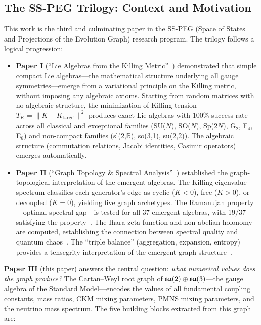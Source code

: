 \subsection{The SS-PEG Trilogy: Context and Motivation}\label{sec:trilogy}

This work is the third and culminating paper in the SS-PEG (Space of States and Projections of the Evolution Graph) research program. The trilogy follows a logical progression:

\begin{itemize}
\item \textbf{Paper I} (``Lie Algebras from the Killing Metric''~\cite{paper1_killing_algebra}) demonstrated that simple compact Lie algebras---the mathematical structure underlying all gauge symmetries---emerge from a variational principle on the Killing metric, without imposing any algebraic axioms. Starting from random matrices with no algebraic structure, the minimization of Killing tension $T_K = \|K - K_{\mathrm{target}}\|^2$ produces exact Lie algebras with 100\% success rate across all classical and exceptional families (SU($N$), SO($N$), Sp($2N$), G$_2$, F$_4$, E$_6$) and non-compact families (sl(2,$\mathbb{R}$), so(3,1), su(2,2)). The algebraic structure (commutation relations, Jacobi identities, Casimir operators) emerges automatically.

\item \textbf{Paper II} (``Graph Topology \& Spectral Analysis''~\cite{paper2_graph_topology}) established the graph-topological interpretation of the emergent algebras. The Killing eigenvalue spectrum classifies each generator's edge as cyclic ($K < 0$), free ($K > 0$), or decoupled ($K = 0$), yielding five graph archetypes. The Ramanujan property---optimal spectral gap---is tested for all 37 emergent algebras, with 19/37 satisfying the property~\cite{lubotzky1988ramanujan,margulis1975explicit}. The Ihara zeta function and non-abelian holonomy are computed, establishing the connection between spectral quality and quantum chaos~\cite{ihara1966discrete,west2025quantum}. The ``triple balance'' (aggregation, expansion, entropy) provides a tensegrity interpretation of the emergent graph structure~\cite{paper2_graph_topology}.
\end{itemize}

\textbf{Paper III} (this paper) answers the central question: \textit{what numerical values does the graph produce?} The Cartan--Weyl root graph of $\mathfrak{su}(2) \oplus \mathfrak{su}(3)$---the gauge algebra of the Standard Model---encodes the values of all fundamental coupling constants, mass ratios, CKM mixing parameters, PMNS mixing parameters, and the neutrino mass spectrum. The five building blocks extracted from this graph are:

